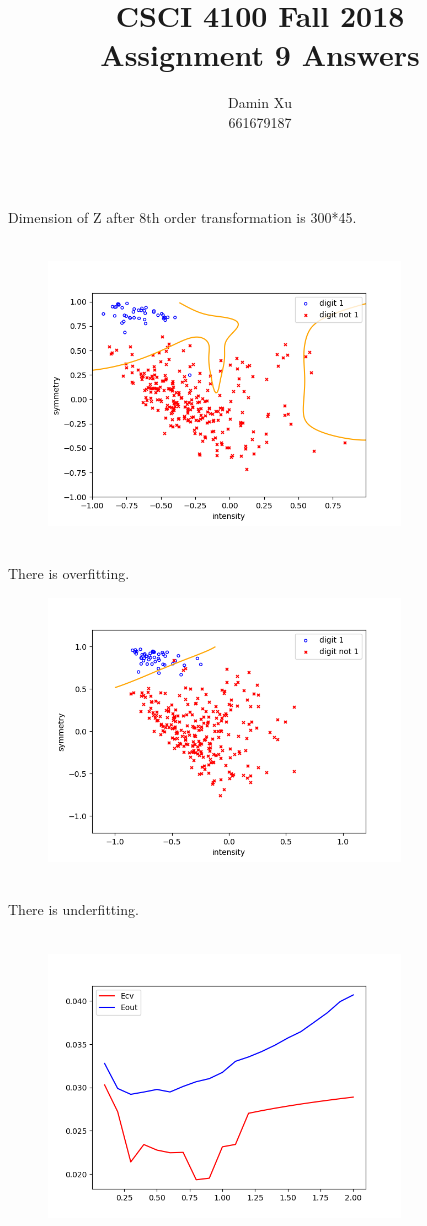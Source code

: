 \documentclass[11pt]{article}
\title{CSCI 4100 Fall 2018 \\
Assignment 9 Answers}
\author{Damin Xu\\661679187}
\begin{document}
\maketitle
\\
Dimension of Z after 8th order transformation is 300*45.
\\\\
\begin{figure}[htb] 
	{\includegraphics[height=7cm]{problem2.png}}
\end{figure}
\\There is overfitting.
\newpage
{}
\begin{figure}[htb] 
	{\includegraphics[height=7cm]{problem3.png}}
\end{figure}\\
There is underfitting.
\\\\
\begin{figure}[htb] 
	{\includegraphics[height=7cm]{problem4.png}}
\end{figure}
\end{document}
